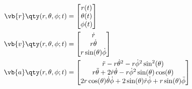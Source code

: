     \begin{align*}
        \vb{r}\qty(r,\theta,\phi; t)&=
        \begin{bmatrix}
        r(t)
        \\
        \theta(t)
        \\
        \phi(t)
        \end{bmatrix}
        \\
        \vb{v}\qty(r,\theta,\phi;t)&=
        \begin{bmatrix}
        \dot{r}
        \\
        r\dot{\theta}
        \\
        r\sin(\theta)\dot{\phi}
        \end{bmatrix}
        \\
        \vb{a}\qty(r,\theta,\phi;t)&=
        \begin{bmatrix}
        \Ddot{r}-r\dot{\theta}^2-r\dot{\phi}^2\sin^2(\theta)
        \\
        r\Ddot{\theta}+2\dot{r}\dot{\theta}-r\dot{\phi}^2\sin(\theta)\cos(\theta)
        \\
        2r\cos(\theta)\dot{\theta}\dot{\phi}+2\sin(\theta)\dot{r}\dot{\phi}+r\sin(\theta)\Ddot{\phi}
        \end{bmatrix}
    \end{align*}
\newpage      
%